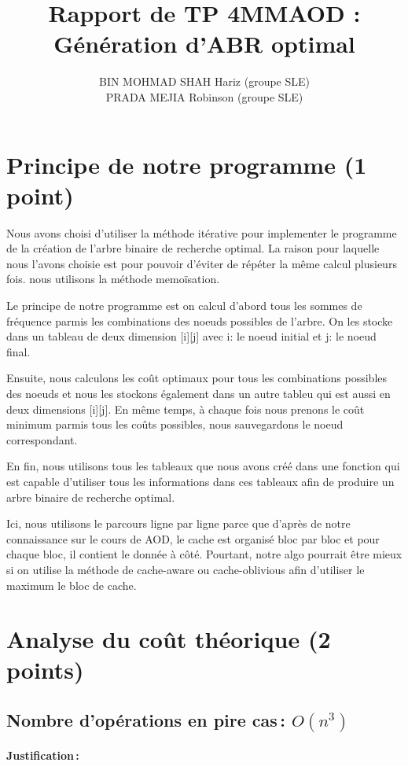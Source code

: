 \documentclass{article}
\title{Rapport de TP 4MMAOD : Génération d'ABR optimal}
\author{
BIN MOHMAD SHAH Hariz (groupe SLE) 
\\ PRADA MEJIA Robinson (groupe SLE) 
}
\begin{document}
\maketitle


\section{Principe de notre  programme (1 point)}
Nous avons choisi d'utiliser la méthode itérative pour implementer le programme de la création de l'arbre binaire de recherche optimal. La raison pour laquelle nous l'avons choisie est pour pouvoir d'éviter de répéter la même calcul plusieurs fois. nous utilisons la méthode memoïsation.

Le principe de notre programme est on calcul d'abord tous les sommes de fréquence parmis les combinations des noeuds possibles de l'arbre. On les stocke dans un tableau de deux dimension [i][j] avec i: le noeud initial et j: le noeud final.

Ensuite, nous calculons les coût optimaux pour tous les combinations possibles des noeuds et nous les stockons également dans un autre tableu qui est aussi en deux dimensions [i][j]. En même temps, à chaque fois nous prenons le coût minimum parmis tous les coûts possibles, nous sauvegardons le noeud correspondant.

En fin, nous utilisons tous les tableaux que nous avons créé dans une fonction qui est capable d'utiliser tous les informations dans ces tableaux afin de produire un arbre binaire de recherche optimal.

Ici, nous utilisons le parcours ligne par ligne parce que d'après de notre connaissance sur le cours de AOD, le cache est organisé bloc par bloc et pour chaque bloc, il contient le donnée à côté. Pourtant, notre algo pourrait être mieux si on utilise la méthode de cache-aware ou cache-oblivious afin d'utiliser le maximum le bloc de cache.

\section{Analyse du coût théorique (2 points)}

  \subsection{Nombre  d'opérations en pire cas\,:  $O(n^3)$} 
    \paragraph{Justification\,: } 
\end{document}
